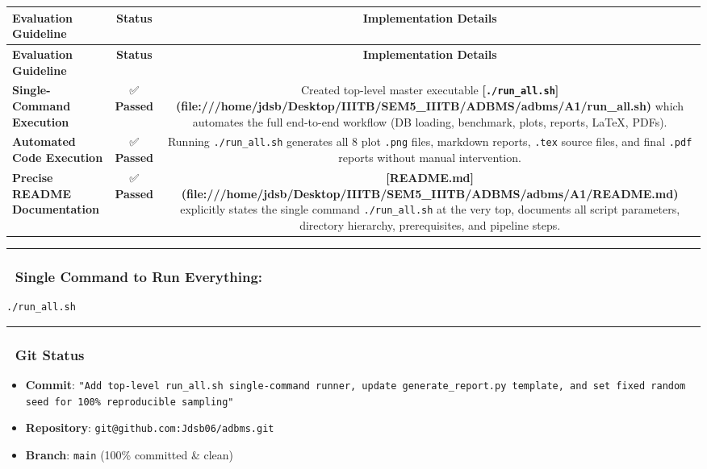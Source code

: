 \documentclass[11pt,a4paper]{article}
\begin{document}
{\begingroup
\small
\setlength{\tabcolsep}{5pt}
\begin{xltabular}{\textwidth}{l | C | C}
\toprule
\textbf{Evaluation Guideline} & \textbf{Status} & \textbf{Implementation Details} \\
\midrule
\endfirsthead
\toprule
\textbf{Evaluation Guideline} & \textbf{Status} & \textbf{Implementation Details} \\
\midrule
\endfirsthead
\endhead
\bottomrule
\endfoot
\bottomrule
\endlastfoot
\textbf{Single-Command Execution} & ✅ \textbf{Passed} & Created top-level master executable \textbf{[\texttt{./run\_all.sh}](file:///home/jdsb/Desktop/IIITB/SEM5\_IIITB/ADBMS/adbms/A1/run\_all.sh)} which automates the full end-to-end workflow (DB loading, benchmark, plots, reports, LaTeX, PDFs). \\
\textbf{Automated Code Execution} & ✅ \textbf{Passed} & Running \texttt{./run\_all.sh} generates all 8 plot \texttt{.png} files, markdown reports, \texttt{.tex} source files, and final \texttt{.pdf} reports without manual intervention. \\
\textbf{Precise README Documentation} & ✅ \textbf{Passed} & \textbf{[README.md](file:///home/jdsb/Desktop/IIITB/SEM5\_IIITB/ADBMS/adbms/A1/README.md)} explicitly states the single command \texttt{./run\_all.sh} at the very top, documents all script parameters, directory hierarchy, prerequisites, and pipeline steps. \\
\end{xltabular}
\endgroup}


\hrule


\subsubsection{🚀 Single Command to Run Everything:}
\begin{lstlisting}[language=bash]
./run_all.sh
\end{lstlisting}


\hrule


\subsubsection{🐙 Git Status}
\begin{itemize}
\item \textbf{Commit}: \texttt{"Add top-level run\_all.sh single-command runner, update generate\_report.py template, and set fixed random seed for 100\% reproducible sampling"}
\item \textbf{Repository}: \texttt{git@github.com:Jdsb06/adbms.git}
\item \textbf{Branch}: \texttt{main} (100\% committed \& clean)
\end{itemize}
\end{document}
